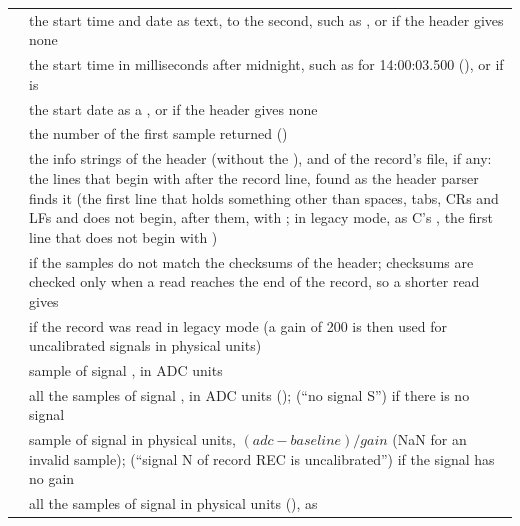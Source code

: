 \begin{xltabular}{\linewidth}{@{}lL@{}}
 & the start time and date as text, to the second, such as
  , or  if the header gives none \\
 & the start time in milliseconds after midnight, such as
   for 14:00:03.500 (), or  if  is
   \\
 & the start date as a , or 
  if the header gives none \\
 & the number of the first sample returned () \\
 & the info strings of the header (without the \code{\#}), and of the
  record's  file, if any: the lines that begin with \code{\#} after the
  record line, found as the header parser finds it (the first line that holds something
  other than spaces, tabs, CRs and LFs and does not begin, after them, with \code{\#}; in
  legacy mode, as C's , the first line that does not begin with
  \code{\#}) \\
 &  if the samples do not match the checksums of the
  header; checksums are checked only when a read reaches the end of the record, so a
  shorter read gives  \\
 &  if the record was read in legacy mode (a gain of 200 is then
  used for uncalibrated signals in physical units) \\
 & sample  of signal , in ADC units \\
 & all the samples of signal , in ADC units ();
   (``no signal S'') if there is no signal  \\
 & sample  of signal  in physical units,
  $(\mathit{adc} - \mathit{baseline}) / \mathit{gain}$ (NaN for an invalid sample);
   (``signal N of record REC is uncalibrated'') if the signal has no
  gain \\
 & all the samples of signal  in physical units
  (), as  \\
\end{xltabular}

